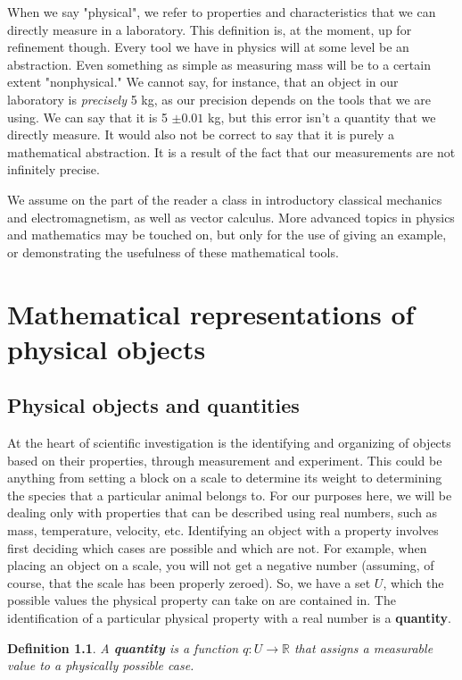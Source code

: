 \documentclass{book}
\newtheorem{defn}[equation]{Definition}
\begin{document}
When we say "physical", we refer to properties and characteristics that we can directly measure in a laboratory. This definition is, at the moment, up for refinement though. Every tool we have in physics will at some level be an abstraction. Even something as simple as measuring mass will be to a certain extent "nonphysical." We cannot say, for instance, that an object in our laboratory is \emph{precisely} 5 kg, as our precision depends on the tools that we are using. We can say that it is 5 $\pm 0.01$ kg, but this error isn't a quantity that we directly measure. It would also not be correct to say that it is purely a mathematical abstraction. It is a result of the fact that our measurements are not infinitely precise. 

We assume on the part of the reader a class in introductory classical mechanics and electromagnetism, as well as vector calculus. More advanced topics in physics and mathematics may be touched on, but only for the use of giving an example, or demonstrating the usefulness of these mathematical tools. 


\chapter{Mathematical representations of physical objects}



\section{Physical objects and quantities}

At the heart of scientific investigation is the identifying and organizing of objects based on their properties, through measurement and experiment. This could be anything from setting a block on a scale to determine its weight to determining the species that a particular animal belongs to. For our purposes here, we will be dealing only with properties that can be described using real numbers, such as mass, temperature, velocity, etc. Identifying an object with a property involves first deciding which cases are possible and which are not. For example, when placing an object on a scale, you will not get a negative number (assuming, of course, that the scale has been properly zeroed). So, we have a set $U$, which the possible values the physical property can take on are contained in. The identification of a particular physical property with a real number is a \textbf{quantity}.

\begin{defn}
	A \textbf{quantity} is a function $q : U \to \mathbb{R}$ that assigns a measurable value to a physically possible case.
\end{defn}
\end{document}
